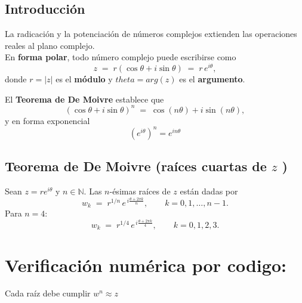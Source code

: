 \documentclass[
  letterpaper,
  DIV=11,
  numbers=noendperiod]{scrreprt}
\begin{document}
\section{Introducción}\label{introducciuxf3n-1}

La radicación y la potenciación de números complejos extienden las
operaciones reales al plano complejo.\\
En \textbf{forma polar}, todo número complejo puede escribirse como \[
z \;=\; r(\cos\theta + i\sin\theta) \;=\; r\,e^{i\theta},
\] donde \(r=|z|\) es el \textbf{módulo} y \(theta=arg(z)\) es el
\textbf{argumento}.

El \textbf{Teorema de De Moivre} establece que \[
(\cos\theta + i\sin\theta)^n \;=\; \cos(n\theta) + i\sin(n\theta),
\] y en forma exponencial \[(e^{i\theta})^n = e^{in\theta}\]

\section{\texorpdfstring{Teorema de De Moivre (raíces cuartas de \(z\)
)}{Teorema de De Moivre (raíces cuartas de z )}}\label{teorema-de-de-moivre-rauxedces-cuartas-de-z}

Sean \(z=re^{i\theta}\) y \(n\in\mathbb{N}\). Las \(n\)-ésimas raíces de
\(z\) están dadas por \[
w_k \;=\; r^{1/n}\,e^{\,i\frac{\theta+2\pi k}{n}},\qquad k=0,1,\dots,n-1.
\] Para \(n=4\): \[
w_k \;=\; r^{1/4}\,e^{\,i\frac{\theta+2\pi k}{4}},\qquad k=0,1,2,3.
\]


\chapter{Verificación numérica por
codigo:}\label{verificaciuxf3n-numuxe9rica-por-codigo}

Cada raíz debe cumplir \(w^n ≈ z\)
\end{document}
